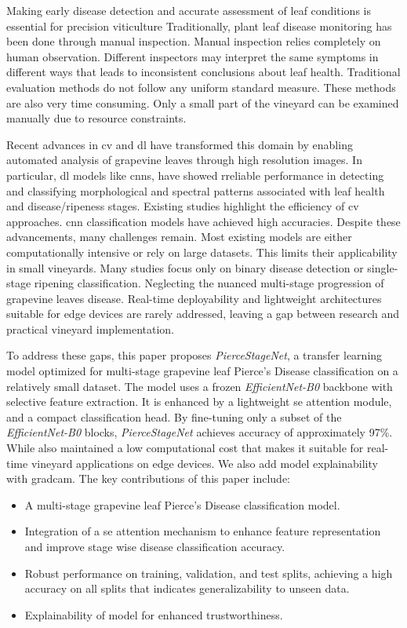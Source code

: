\documentclass[conference]{IEEEtran}
\begin{document}
Making early disease detection and accurate assessment of leaf conditions is essential for precision viticulture Traditionally, plant leaf disease monitoring has been done through manual inspection. Manual inspection relies completely on human observation. Different inspectors may interpret the same symptoms in different ways that leads to inconsistent conclusions about leaf health. Traditional evaluation methods do not follow any uniform standard measure. These methods are also very time consuming. Only a small part of the vineyard can be examined manually due to resource constraints.

Recent advances in \ac{cv} and \ac{dl} have transformed this domain by enabling automated analysis of grapevine leaves through high resolution images. In particular, \ac{dl} models like \ac{cnn}s, have showed rreliable performance in detecting and classifying morphological and spectral patterns associated with leaf health and disease/ripeness stages. Existing studies highlight the efficiency of \ac{cv} approaches. \ac{cnn} classification models have achieved high accuracies.  Despite these advancements, many challenges remain. Most existing models are either computationally intensive or rely on large datasets. This limits their applicability in small vineyards. Many studies focus only on binary disease detection or single-stage ripening classification. Neglecting the nuanced multi-stage progression of grapevine leaves disease. Real-time deployability and lightweight architectures suitable for edge devices are rarely addressed, leaving a gap between research and practical vineyard implementation.

To address these gaps, this paper proposes \textit{PierceStageNet}, a transfer learning model optimized for multi-stage grapevine leaf Pierce's Disease classification on a relatively small dataset. The model uses a frozen \textit{EfficientNet-B0} \cite{pmlr-v97-tan19a} backbone with selective feature extraction. It is enhanced by a lightweight \ac{se} attention \cite{Hu_2018_CVPR} module, and a compact classification head. By fine-tuning only a subset of the \textit{EfficientNet-B0} blocks, \textit{PierceStageNet} achieves accuracy of approximately 97\%. While  also maintained a low computational cost that makes it suitable for real-time vineyard applications on edge devices. We also add model explainability with \ac{gradcam}. The key contributions of this paper include:
\begin{itemize}
	\item A multi-stage grapevine leaf Pierce's Disease classification model.
	\item Integration of a \ac{se} attention mechanism to enhance feature representation and improve stage wise disease classification accuracy.
	\item Robust performance on training, validation, and test splits, achieving a high accuracy on all splits that indicates generalizability to unseen data.
	\item Explainability of model for enhanced trustworthiness.
\end{itemize}
\end{document}
